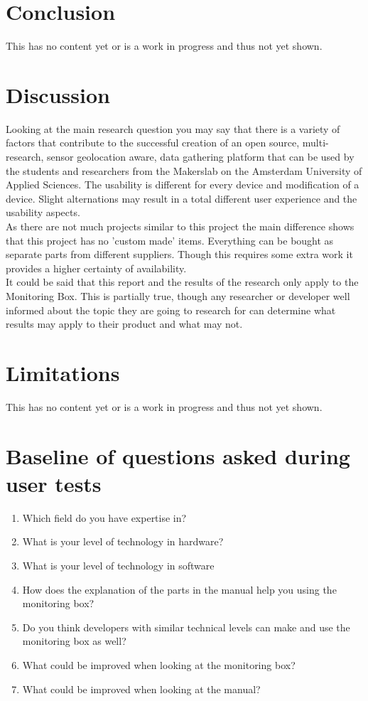 \documentclass[conference]{IEEEtran}
\begin{document}
\section{Conclusion}
This has no content yet or is a work in progress and thus not yet shown.

\section{Discussion}
Looking at the main research question you may say that there is a variety of factors that contribute to the successful creation of an open source, multi-research, sensor geolocation aware, data gathering platform that can be used by the students and researchers from the Makerslab on the Amsterdam University of Applied Sciences. The usability is different for every device and modification of a device. Slight alternations may result in a total different user experience and the usability aspects. \\
As there are not much projects similar to this project the main difference shows that this project has no 'custom made' items. Everything can be bought as separate parts from different suppliers. Though this requires some extra work it provides a higher certainty of availability. \\
It could be said that this report and the results of the research only apply to the Monitoring Box. This is partially true, though any researcher or developer well informed about the topic they are going to research for can determine what results may apply to their product and what may not.

\section{Limitations}
This has no content yet or is a work in progress and thus not yet shown.







\appendices
\section{Baseline of questions asked during user tests}
\begin{enumerate}
\item Which field do you have expertise in?
\item What is your level of technology in hardware?
\item What is your level of technology in software
\item How does the explanation of the parts in the manual help you using the monitoring box?
\item Do you think developers with similar technical levels can make and use the monitoring box as well?\item What could be improved when looking at the monitoring box?
\item What could be improved when looking at the manual?
\end{enumerate}
\end{document}
